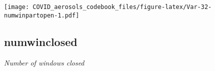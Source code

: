 \documentclass[]{article}
\begin{document}
\begin{minipage}{0.25 \textwidth}

\texttt{[image: COVID\_aerosols\_codebook\_files/figure-latex/Var-32-numwinpartopen-1.pdf]}

\end{minipage}

\noindent\makebox[\linewidth]{\rule{\textwidth}{0.4pt}}

\hypertarget{numwinclosed}{%
\subsection{numwinclosed}\label{numwinclosed}}

\emph{Number of windows closed}

\begin{minipage}{0.75 \textwidth}


\end{minipage}
\end{document}
